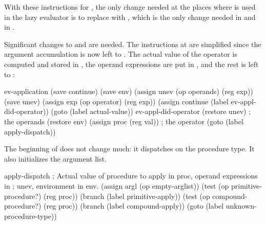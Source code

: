 \begin{exe}[5.25]
    With these instructions for , the only change needed at 
    the places where  is used in the lazy evaluator is to 
    replace  with
    , which is the only change needed in 
     and in .

    Significant changes to  and  are 
    needed. The instructions at  are simplified since the 
    argument accumulation is now left to . The actual value 
    of the operator is computed and stored in , the operand 
    expressions are put in , and the rest is left to 
    :
    \begin{cscm}
    ev-application
        (save continue)
        (save env)
        (assign unev (op operands) (reg exp))
        (save unev)
        (assign exp (op operator) (reg exp))
        (assign continue (label ev-appl-did-operator))
        (goto (label actual-value))
    ev-appl-did-operator
        (restore unev)          ; the operands
        (restore env)
        (assign proc (reg val)) ; the operator
        (goto (label apply-dispatch))
    \end{cscm}

    The beginning of  does not change much: it dispatches 
    on the procedure type. It also initializes the argument list.
    \begin{cscm}
    apply-dispatch
        ; Actual value of procedure to apply in proc, operand expressions in 
        ; unev, environment in env.
        (assign argl (op empty-arglist))
        (test (op primitive-procedure?) (reg proc))
        (branch (label primitive-apply))
        (test (op compound-procedure?) (reg proc))
        (branch (label compound-apply))
        (goto (label unknown-procedure-type))
    \end{cscm}


\end{exe}
